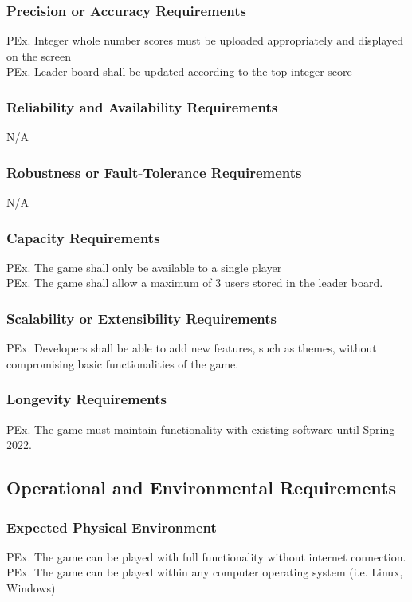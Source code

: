\documentclass[12pt]{article}
\begin{document}
    \subsubsection{Precision or Accuracy Requirements}
    PEx. Integer whole number scores must be uploaded appropriately and displayed on the screen\\
    PEx. Leader board shall be updated according to the top integer score
    
    \subsubsection{Reliability and Availability Requirements}
    N/A

    \subsubsection{Robustness or Fault-Tolerance Requirements}
    N/A
    
    \subsubsection{Capacity Requirements}
    PEx. The game shall only be available to a single player\\
    PEx. The game shall allow a maximum of 3 users stored in the leader board.
    
    \subsubsection{Scalability or Extensibility Requirements}
    PEx. Developers shall be able to add new features, such as themes, without compromising basic functionalities of the game. 
    
    \subsubsection{Longevity Requirements}
    PEx. The game must maintain functionality with existing software until Spring 2022.


\subsection{Operational and Environmental Requirements}
    \subsubsection{Expected Physical Environment}
    PEx. The game can be played with full functionality without internet connection.\\
    PEx. The game can be played within any computer operating system (i.e. Linux, Windows)
    
\end{document}
